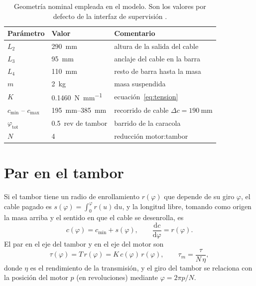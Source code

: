 \begin{table}[H]
\centering
\caption{Geometría nominal empleada en el modelo. Son los valores por defecto de la interfaz de
supervisión .}
\label{tab:geometria}
\begin{tabular}{@{}lll@{}}
\toprule
Parámetro & Valor & Comentario \\
\midrule
$L_2$ & \SI{290}{\milli\metre} & altura de la salida del cable \\
$L_3$ & \SI{95}{\milli\metre} & anclaje del cable en la barra \\
$L_4$ & \SI{110}{\milli\metre} & resto de barra hasta la masa \\
$m$ & \SI{2}{\kilo\gram} & masa suspendida \\
$K$ & \SI{0.1460}{\newton\per\milli\metre} & ecuación~\eqref{eq:tension} \\
$c_{\min}$ -- $c_{\max}$ & \SIrange{195}{385}{\milli\metre} & recorrido de cable $\Delta c=\SI{190}{\milli\metre}$ \\
$\varphi_{\text{tot}}$ & \SI{0.5}{rev} de tambor & barrido de la caracola \\
$N$ & 4 & reducción motor:tambor \\
\bottomrule
\end{tabular}
\end{table}

\section{Par en el tambor}

Si el tambor tiene un radio de enrollamiento $r(\varphi)$ que depende de su giro $\varphi$, el
cable pagado es $s(\varphi) = \int_0^{\varphi} r(u)\,\mathrm{d}u$, y la longitud libre, tomando como
origen la masa arriba y el sentido en que el cable se desenrolla, es
\begin{equation}
  c(\varphi) = c_{\min} + s(\varphi), \qquad \frac{\mathrm{d}c}{\mathrm{d}\varphi} = r(\varphi).
  \label{eq:cable-tambor}
\end{equation}
El par en el eje del tambor y en el eje del motor son
\begin{equation}
  \tau(\varphi) = T\,r(\varphi) = K\,c(\varphi)\,r(\varphi), \qquad
  \tau_m = \frac{\tau}{N\,\eta},
  \label{eq:par}
\end{equation}
donde $\eta$ es el rendimiento de la transmisión, y el giro del tambor se relaciona con la posición
del motor $p$ (en revoluciones) mediante $\varphi = 2\pi p/N$.

